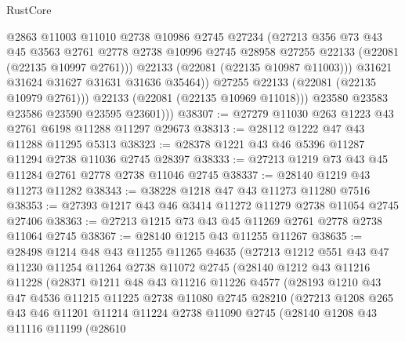 \begin{lexlean}{RustCore}
\begin{coremodule}
                    @2863
                    @11003
                    @11010
                    @2738
                    @10986
                    @2745
                    @27234
                    (@27213
                      @356
                      @73
                      @43
                      @45
                      @3563
                      @2761
                      @2778
                      @2738
                      @10996
                      @2745
                      @28958
                      @27255
                      @22133
                      (@22081 (@22135 @10997 @2761)))
                    @22133
                    (@22081 (@22135 @10987 @11003)))
                  @31621
                  @31624
                  @31627
                  @31631
                  @31636
                  @35464))
              @27255
              @22133
              (@22081 (@22135 @10979 @2761)))
            @22133
            (@22081 (@22135 @10969 @11018)))
          @23580
          @23583
          @23586
          @23590
          @23595
          @23601)))
@38307 := @27279 @11030 @263 @1223 @43 @2761 @6198 @11288 @11297 @29673
@38313 := @28112 @1222 @47 @43 @11288 @11295 @5313
@38323 := @28378 @1221 @43 @46 @5396 @11287 @11294 @2738 @11036 @2745 @28397
@38333 := @27213 @1219 @73 @43 @45 @11284 @2761 @2778 @2738 @11046 @2745
@38337 := @28140 @1219 @43 @11273 @11282
@38343 := @38228 @1218 @47 @43 @11273 @11280 @7516
@38353 := @27393 @1217 @43 @46 @3414 @11272 @11279 @2738 @11054 @2745 @27406
@38363 := @27213 @1215 @73 @43 @45 @11269 @2761 @2778 @2738 @11064 @2745
@38367 := @28140 @1215 @43 @11255 @11267
@38635 := @28498
    @1214
    @48
    @43
    @11255
    @11265
    @4635
    (@27213
      @1212
      @551
      @43
      @47
      @11230
      @11254
      @11264
      @2738
      @11072
      @2745
      (@28140
        @1212
        @43
        @11216
        @11228
        (@28371
          @1211
          @48
          @43
          @11216
          @11226
          @4577
          (@28193
            @1210
            @43
            @47
            @4536
            @11215
            @11225
            @2738
            @11080
            @2745
            @28210
            (@27213
              @1208
              @265
              @43
              @46
              @11201
              @11214
              @11224
              @2738
              @11090
              @2745
              (@28140
                @1208
                @43
                @11116
                @11199
                (@28610

\end{coremodule}
\end{lexlean}

